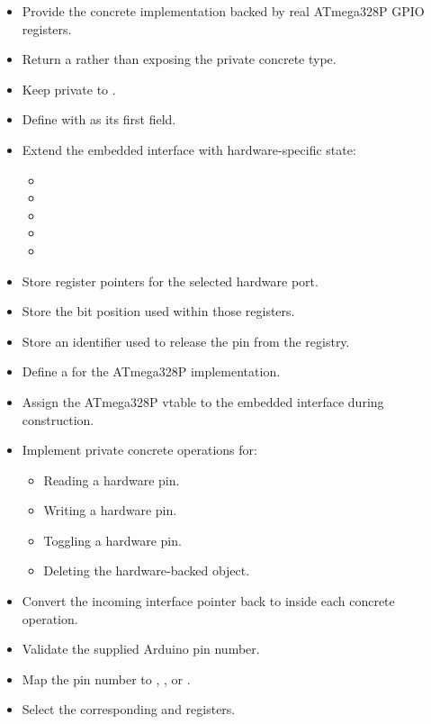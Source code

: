 \begin{itemize}
\begin{itemize}
    \item Provide the concrete implementation backed by real ATmega328P GPIO registers.
    \item Return a  rather than exposing the private concrete type.
    \item Keep  private to .
    \item Define  with  as its first field.
    \item Extend the embedded interface with hardware-specific state:
    \begin{itemize}
      \item {}
      \item {}
      \item {}
      \item {}
      \item {}
    \end{itemize}
    \item Store register pointers for the selected hardware port.
    \item Store the bit position used within those registers.
    \item Store an identifier used to release the pin from the registry.
    \item Define a  for the ATmega328P implementation.
    \item Assign the ATmega328P vtable to the embedded interface during construction.
    \item Implement private concrete operations for:
    \begin{itemize}
      \item Reading a hardware pin.
      \item Writing a hardware pin.
      \item Toggling a hardware pin.
      \item Deleting the hardware-backed object.
    \end{itemize}
    \item Convert the incoming interface pointer back to  inside each concrete
      operation.
    \item Validate the supplied Arduino pin number.
    \item Map the pin number to , , or .
    \item Select the corresponding  and  registers.

\end{itemize}
\end{itemize}
